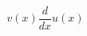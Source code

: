 \documentclass[preview]{standalone}
\begin{document}
\begin{align*}
v(x)\dfrac{d}{dx}u(x)
\end{align*}
\end{document}

